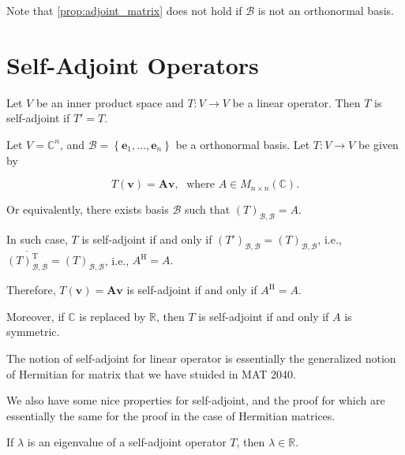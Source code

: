 Note that \autoref{prop:adjoint_matrix} does not hold if \(\mathcal{B}\) is not an orthonormal basis.

\section{Self-Adjoint Operators}
\begin{definition}
Let \(V\) be an inner product space and \(T : V \rightarrow  V\) be a linear operator. Then \(T\) is self-adjoint if \(T' = T\).
\end{definition}

\begin{example}
Let \(V = {\mathbb{C}}^{n}\), and \(\mathcal{B} = \left\{  {{\mathbf{e}}_{1},\ldots ,{\mathbf{e}}_{n}}\right\}\) be a orthonormal basis. Let \(T : V \rightarrow  V\) be given by

\[
T\left( \mathbf{v}\right)  = \mathbf{{Av}},\;\text{ where }A \in  {M}_{n \times  n}\left( \mathbb{C}\right) .
\]

Or equivalently, there exists basis \(\mathcal{B}\) such that \({\left( T\right) }_{\mathcal{B},\mathcal{B}} = A\).

In such case, \(T\) is self-adjoint if and only if \({\left( T'\right) }_{\mathcal{B},\mathcal{B}} = {\left( T\right) }_{\mathcal{B},\mathcal{B}}\), i.e., \(\overline{{\left( T\right) }_{\mathcal{B},\mathcal{B}}^{\mathrm{T}}} = {\left( T\right) }_{\mathcal{B},\mathcal{B}}\), i.e., \({A}^{\mathrm{H}} = A.\)

Therefore, \(T\left( \mathbf{v}\right)  = \mathbf{{Av}}\) is self-adjoint if and only if \({A}^{\mathrm{H}} = A\).

Moreover, if \(\mathbb{C}\) is replaced by \(\mathbb{R}\), then \(T\) is self-adjoint if and only if \(A\) is symmetric.
\end{example}

The notion of self-adjoint for linear operator is essentially the generalized notion of Hermitian for matrix that we have stuided in MAT 2040.

We also have some nice properties for self-adjoint, and the proof for which are essentially the same for the proof in the case of Hermitian matrices.

\begin{proposition}\label{prop: self-adjoint-eigenvalue}
If \(\lambda\) is an eigenvalue of a self-adjoint operator \(T\), then \(\lambda \in \mathbb{R}\).
\end{proposition}

